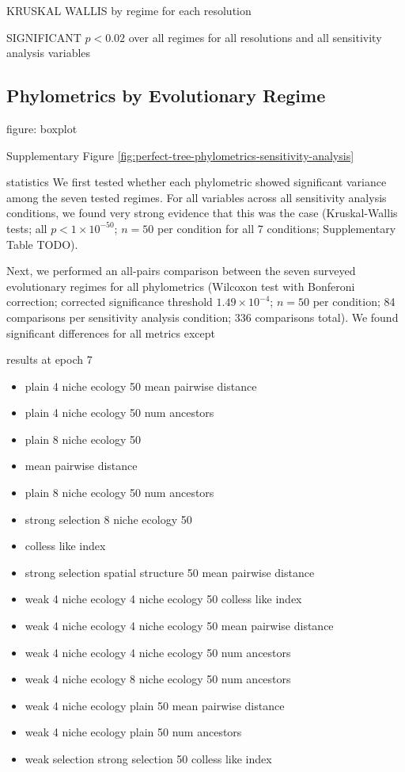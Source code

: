 KRUSKAL WALLIS by regime for each resolution

SIGNIFICANT $p < 0.02$ over all regimes for all resolutions and all sensitivity analysis variables


\subsection{Phylometrics by Evolutionary Regime}

figure: boxplot


Supplementary Figure \ref{fig:perfect-tree-phylometrics-sensitivity-analysis}



statistics
We first tested whether each phylometric showed significant variance among the seven tested regimes. For all variables across all sensitivity analysis conditions, we found very strong evidence that this was the case (Kruskal-Wallis tests; all $p < 1\times10^{-50}$; $n=50$ per condition for all 7 conditions; Supplementary Table TODO).

Next, we performed an all-pairs comparison between the seven surveyed evolutionary regimes for all phylometrics (Wilcoxon test with Bonferoni correction; corrected significance threshold $1.49 \times 10^{-4}$; $n=50$ per condition; 84 comparisons per sensitivity analysis condition; 336 comparisons total). We found significant differences for all metrics except

results at epoch 7
    \begin{itemize}
        \item plain	4 niche ecology	50	mean pairwise distance
        \item plain	4 niche ecology	50	num ancestors
        \item plain	8 niche ecology	50
        \item mean pairwise distance
        \item plain	8 niche ecology	50	num ancestors
        \item strong selection	8 niche ecology	50
        \item colless like index
        \item strong selection	spatial structure	50	mean pairwise distance
        \item weak 4 niche ecology	4 niche ecology	50	colless like index
        \item weak 4 niche ecology	4 niche ecology	50	mean pairwise distance
        \item weak 4 niche ecology	4 niche ecology	50	num ancestors
        \item weak 4 niche ecology	8 niche ecology	50	num ancestors
        \item weak 4 niche ecology	plain	50	mean pairwise distance
        \item weak 4 niche ecology	plain	50	num ancestors
        \item weak selection	strong selection	50	colless like index
    \end{itemize}

